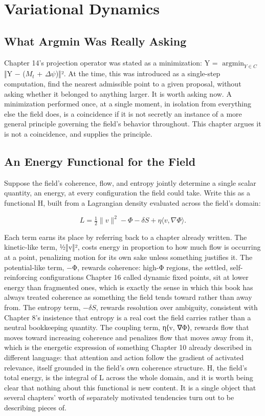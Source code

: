 \chapter{Variational Dynamics}

\section{What Argmin Was Really Asking}

Chapter 14's projection operator was stated as a minimization: Y = \(\operatorname*{argmin}_{Y \in C}\) ‖Y − (\(M_t\) + \(\Delta\psi\))‖². At the time, this was introduced as a single-step computation, find the nearest admissible point to a given proposal, without asking whether it belonged to anything larger. It is worth asking now. A minimization performed once, at a single moment, in isolation from everything else the field does, is a coincidence if it is not secretly an instance of a more general principle governing the field's behavior throughout. This chapter argues it is not a coincidence, and supplies the principle.

\section{An Energy Functional for the Field}

Suppose the field's coherence, flow, and entropy jointly determine a single scalar quantity, an energy, at every configuration the field could take. Write this as a functional H, built from a Lagrangian density evaluated across the field's domain:

\[ L = \tfrac{1}{2}\|v\|^2 - \Phi - \delta S + \eta\langle v, \nabla\Phi\rangle. \]

Each term earns its place by referring back to a chapter already written. The kinetic-like term, ½‖v‖², costs energy in proportion to how much flow is occurring at a point, penalizing motion for its own sake unless something justifies it. The potential-like term, −Φ, rewards coherence: high-Φ regions, the settled, self-reinforcing configurations Chapter 16 called dynamic fixed points, sit at lower energy than fragmented ones, which is exactly the sense in which this book has always treated coherence as something the field tends toward rather than away from. The entropy term, −\(\delta S\), rewards resolution over ambiguity, consistent with Chapter 8's insistence that entropy is a real cost the field carries rather than a neutral bookkeeping quantity. The coupling term, η⟨v, ∇Φ⟩, rewards flow that moves toward increasing coherence and penalizes flow that moves away from it, which is the energetic expression of something Chapter 10 already described in different language: that attention and action follow the gradient of activated relevance, itself grounded in the field's own coherence structure. H, the field's total energy, is the integral of L across the whole domain, and it is worth being clear that nothing about this functional is new content. It is a single object that several chapters' worth of separately motivated tendencies turn out to be describing pieces of.

